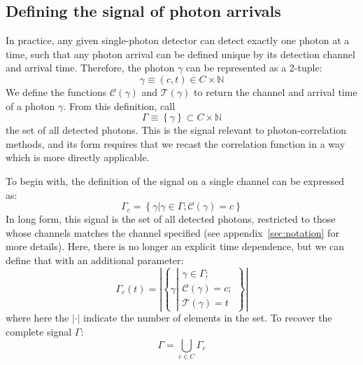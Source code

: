 \documentclass{article}
\newcommand{\braces}[1]{\ensuremath{\left\lbrace #1 \right\rbrace}}
\newcommand{\wholes}{\ensuremath{\mathbb{N}}}
\newcommand{\abs}[1]{\ensuremath{\left|#1\right|}}
\newcommand{\Channel}{\ensuremath{\mathcal{C}}}
\newcommand{\Time}{\ensuremath{\mathcal{T}}}
\newcommand{\photon}{\ensuremath{\gamma}}
\newcommand{\photons}{\ensuremath{\Gamma}}
\begin{document}
\subsection{Defining the signal of photon arrivals}
In practice, any given single-photon detector can detect exactly one photon at a time, such that any photon arrival can be defined unique by its detection channel and arrival time. Therefore, the photon $\gamma$ can be represented as a 2-tuple:
\begin{equation}
\photon\equiv (c, t)\in C\times\wholes
\end{equation}
We define the functions $\Channel(\photon)$ and $\Time(\photon)$ to return the channel and arrival time of a photon \photon. From this definition, call
\begin{equation}
\photons\equiv\braces{\photon}\subset C\times\wholes
\end{equation}
the set of all detected photons. This is the signal relevant to photon-correlation methods, and its form requires that we recast the correlation function in a way which is more directly applicable. 

To begin with, the definition of the signal on a single channel can be expressed as:
\begin{equation}
\photons_{c} = \braces{\photon\left|\photon\in\photons; \Channel(\photon)=c\right.}
\end{equation}
In long form, this signal is the set of all detected photons, restricted to those whose channels matches the channel specified (see appendix~\ref{sec:notation} for more details). Here, there is no longer an explicit time dependence, but we can define that with an additional parameter:
\begin{equation}
\photons_{c}(t) = \abs{\braces{\photon\left|\begin{aligned}
                                          \photon\in\photons; \\
                                           \Channel(\photon)=c;\\
                                           \Time(\photon)=t
                                     \end{aligned}\right.}}
\end{equation}
where here the \abs{\cdot} indicate the number of elements in the set. To recover the complete signal \photons:
\begin{equation}
\photons = \bigcup\limits_{c\in C}{\photons_{c}}
\end{equation}
\end{document}
